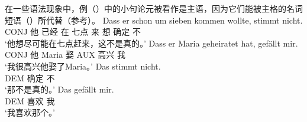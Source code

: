 \noindent
在一些语法现象中，例（）中的小句论元被看作是主语，因为它们能被主格的名词短语（）所代替（参考\eg \citealp[, 289]{Eisenberg2004a}）。
\eal
\ex
\gll Dass er schon um sieben kommen wollte, stimmt nicht.\\
	 CONJ 他 已经 在 七点 来 想 确定 不\\
\glt `他想尽可能在七点赶来，这不是真的。'
\ex 
\gll Dass er Maria geheiratet hat, gefällt mir.\\
	 CONJ 他 Maria 娶 AUX 高兴 我\\
\glt `我很高兴他娶了Maria。'
\zl
\eal
\ex
\gll Das stimmt nicht.\\
	 DEM 确定 不\\
\glt `那不是真的。'
\ex 
\gll Das gefällt mir.\\
	  DEM 喜欢 我\\
\glt `我喜欢那个。'
\zl
